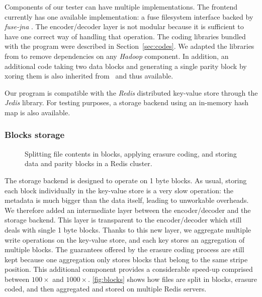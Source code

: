 Components of our tester can have multiple implementations. The frontend currently has one available implementation: a \ac{fuse} filesystem interface backed by \textit{fuse-jna} \autocite{fuse-jna}.
The encoder/decoder layer is not modular because it is sufficient to have one correct way of handling that operation. The coding libraries bundled with the program were described in Section~\ref{sec:codes}. We adapted the libraries from \autocite{XorbasVLDB} to remove dependencies on any \textit{Hadoop} component. In addition, an additional code taking two data blocks and generating a single parity block by xoring them is also inherited from~\autocite{XorbasVLDB} and thus available. 

Our program is compatible with the \textit{Redis} distributed key-value store through the \textit{Jedis} library. For testing purposes, a storage backend using an in-memory hash map is also available.

\subsubsection{Blocks storage}

\begin{figure}[t]
    \centering
    
    \caption{Splitting file contents in blocks, applying erasure coding, and storing data and parity blocks in a Redis cluster.}
    \label{fig:blocks}
\end{figure}

The storage backend is designed to operate on 1 byte blocks. 
As usual, storing each block individually in the key-value store is a very slow operation: the metadata is much bigger than the data itself, leading to unworkable overheads. We therefore added an intermediate layer between the encoder/decoder and the storage backend. This layer is transparent to the encoder/decoder which still deals with single 1 byte blocks. Thanks to this new layer, we aggregate multiple write operations on the key-value store, and each key stores an aggregation of multiple blocks.
The guarantees offered by the erasure coding process are still kept because one aggregation only stores blocks that belong to the same stripe position. This additional component provides a considerable speed-up comprised between $100\times$ and $1000\times$. \autoref{fig:blocks} shows how files are split in blocks, erasure coded, and then aggregated and stored on multiple Redis servers. 

